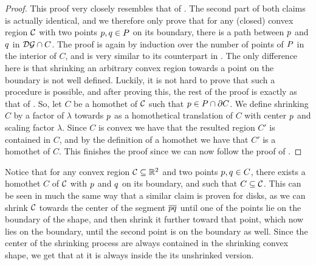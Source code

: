 \documentclass[12pt]{article}%
\begin{document}
\begin{proof}
    This proof very closely resembles that of
    . The second part of both claims is actually
    identical, and we therefore only prove that for any (closed)
    convex region $\mathcal{C}$ with two points $p,q\in P$ on its
    boundary, there is a path between $p$ and $q$ in
    $\mathcal{DG} \cap {C}$.  The proof is again by induction over the
    number of points of $P$ in the interior of $C$, and is very
    similar to its counterpart in . The only
    difference here is that shrinking an arbitrary convex region
    towards a point on the boundary is not well defined.  Luckily, it
    is not hard to prove that such a procedure is possible, and after
    proving this, the rest of the proof is exactly as that of
    .  So, let $C$ be a homothet of $\mathcal{C}$ such
    that $p\in P\cap\partial C$. We define shrinking $C$ by a
    factor of $\lambda$ towards $p$ as a homothetical translation of
    $C$ with center $p$ and scaling factor $\lambda$. Since $C$ is
    convex we have that the resulted region $C'$ is contained in $C$,
    and by the definition of a homothet we have that $C'$ is a
    homothet of $C$.  This finishes the proof since we can now follow
    the proof of .

\end{proof}

Notice that for any convex region $\mathcal{C}\subseteq \mathbb{R}^2$ and two points
$p,q \in C$, there exists a homothet $C$ of $\mathcal{C}$ with $p$ and
$q$ on its boundary, and such that $C\subseteq \mathcal{C}$. This can be
seen in much the same way that a similar claim is proven for disks, as
we can shrink $\mathcal{C}$ towards the center of the segment
$\overline{pq}$ until one of the points lie on the boundary of the
shape, and then shrink it further toward that point, which now lies on
the boundary, until the second point is on the boundary as well. Since
the center of the shrinking process are always contained in the
shrinking convex shape, we get that at it is always inside the its
unshrinked version.
\end{document}
